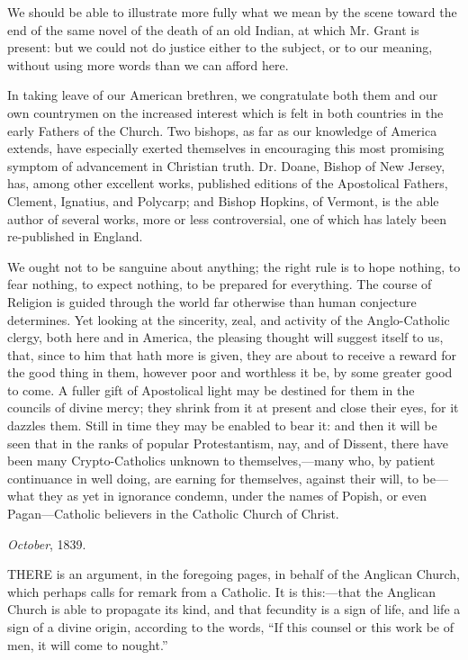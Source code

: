 We should be able to illustrate more fully what
we mean by the scene toward the end of the same novel of the death of
an old Indian, at which Mr. Grant is present: but we could not do
justice either to the subject, or to our meaning, without using more
words than we can afford here.

In taking leave of our American brethren, we
congratulate both them and our own countrymen on the increased
interest which is felt in both countries in the early Fathers of the
Church. Two bishops, as far as our knowledge of America extends, have
especially exerted themselves in encouraging this most promising
symptom of advancement in Christian truth. Dr. Doane, Bishop of New
Jersey, has, among other excellent works, published editions of the
Apostolical Fathers, Clement, Ignatius, and Polycarp; and Bishop
Hopkins, of Vermont, is the able author of several works, more or less
controversial, one of which has lately been re-published in England.

We ought not to be sanguine about anything; the
right rule is to hope nothing, to fear nothing, to expect nothing, to
be prepared for everything. The course of Religion is guided through
the world far otherwise than human conjecture determines. Yet looking
at the sincerity, zeal, and activity of the Anglo-Catholic clergy,
both here and in America, the pleasing thought will suggest itself to
us, that, since to him that hath more is given, they are about to
receive a reward for the good thing in them, however poor and
worthless it be, by some greater good to come. A fuller gift of
Apostolical light may be destined for them in the councils of divine
mercy; they shrink from it at present and close their eyes, for it
dazzles them. Still in time they may be enabled to bear it: and then
it will be seen that in the ranks of popular Protestantism, nay, and
of Dissent, there have been many Crypto-Catholics unknown to
themselves,—many who, by patient continuance in well doing, are
earning for themselves, against their will, to be—what they as yet
in ignorance condemn, under the names of Popish, or even
Pagan—Catholic believers in the Catholic Church of Christ.

\emph{October}, 1839.


THERE
is an argument, in the foregoing pages, in behalf of the Anglican
Church, which perhaps calls for remark from a Catholic. It is
this:—that the Anglican Church is able to propagate its kind, and
that fecundity is a sign of life, and life a sign of a divine origin,
according to the words, ``If this counsel or this work be of men, it
will come to nought.''

